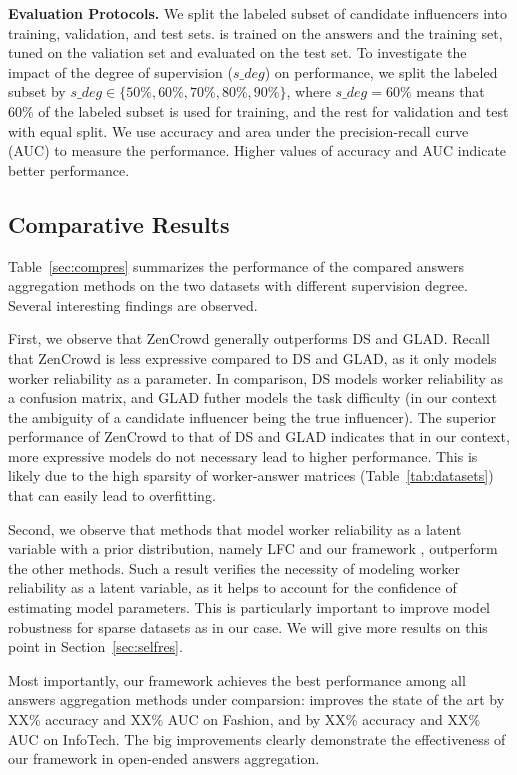 \smallskip
\noindent\textbf{Evaluation Protocols.} We split the labeled subset of candidate influencers into training, validation, and test sets. \sys is trained on the answers and the training set, tuned on the valiation set and evaluated on the test set. To investigate the impact of the degree of supervision ($s\_deg$) on \sys performance, we split the labeled subset by $s\_deg\in \{50\%, 60\%, 70\%, 80\%, 90\%\}$, where $s\_deg = 60\%$ means that 60\% of the labeled subset is used for training, and the rest for validation and test with equal split. We use accuracy and area under the precision-recall curve (AUC) to measure the performance. Higher values of accuracy and AUC indicate better performance.



\subsection{Comparative Results}
Table~\ref{sec:compres} summarizes the performance of the compared answers aggregation methods on the two datasets with different supervision degree. Several interesting findings are observed.

First, we observe that ZenCrowd generally outperforms DS and GLAD. Recall that ZenCrowd is less expressive compared to DS and GLAD, as it only models worker reliability as a parameter. In comparison, DS models worker reliability as a confusion matrix, and GLAD futher models the task difficulty (in our context the ambiguity of a candidate influencer being the true influencer). The superior performance of ZenCrowd to that of DS and GLAD indicates that in our context, more expressive models do not necessary lead to higher performance. This is likely due to the high sparsity of worker-answer matrices (Table~\ref{tab:datasets}) that can easily lead to overfitting.

Second, we observe that methods that model worker reliability as a latent variable with a prior distribution, namely LFC and our framework \sys, outperform the other methods. Such a result verifies the necessity of modeling worker reliability as a latent variable, as it helps to account for the confidence of estimating model parameters. This is particularly important to improve model robustness for sparse datasets as in our case. We  will give more results on this point in Section~\ref{sec:selfres}.

Most importantly, our framework \sys achieves the best performance among all answers aggregation methods under comparsion: \sys improves the state of the art by  XX\% accuracy and XX\% AUC on Fashion, and by XX\% accuracy and XX\% AUC on InfoTech. The big improvements clearly demonstrate the effectiveness of our framework in open-ended answers aggregation. 



